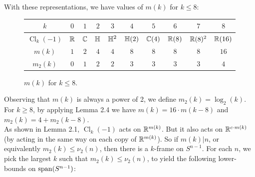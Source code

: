 \documentclass{amsart}
\DeclareMathOperator{\Cl}{\mathrm{Cl}}
\begin{document}
With these representations, we have values of $m(k)$ for $k\leq 8$:

%

\begin{figure}[h]
	\begin{center}
		{\tabulinesep=0.6mm
			\begin{tabu}{|c||c|c|c|c|c|c|c|c|c|}
				\hline 
				$k$ & $0$& $1$& $2$& $3$& $4$& $5$& $6$ &$7$ & $8$\\
				\hline
				$\Cl_k(-1)$& $\mathbb{R}$& $\mathbb{C}$& $\mathbb{H}$& $\mathbb{H}^2$& $\mathbb{H}(2)$& $\mathbb{C}(4)$ & $\mathbb{R}(8)$& $\mathbb{R}(8)^2$& $\mathbb{R}(16)$\\
				\hline
				$m(k)$& $1$& $2$& $4$& $4$& $8$& $8$& $8$& $8$& $16$\\
				\hline
				$m_2(k)$& $0$& $1$& $2$& $2$& $3$& $3$& $3$& $3$& $4$\\
				\hline
				\end{tabu}}
	\end{center}
	\caption{$m(k)$ for $k\leq 8$.}
\end{figure}

Observing that $m(k)$ is always a power of 2, we define $m_2(k)=\log_2(k)$. For $k\geq 8$, by applying Lemma 2.4 we have $m(k)=16\cdot m(k-8)$ and $m_2(k) = 4 + m_2(k-8)$.\\

As shown in Lemma 2.1, $\Cl_k(-1)$ acts on $\mathbb{R}^{m(k)}$. But it also acts on $\mathbb{R}^{c\cdot m(k)}$ (by acting in the same way on each copy of $\mathbb{R}^{m(k)}$). So if $m(k)|n$, or equivalently $m_2(k)\leq \nu_2(n)$, then there is a $k$-frame on $S^{n-1}$. For each $n$, we pick the largest $k$ such that $m_2(k)\leq \nu_2(n)$, to yield the following lower-bounds on $\operatorname{span}(S^{n-1})$:
\end{document}
